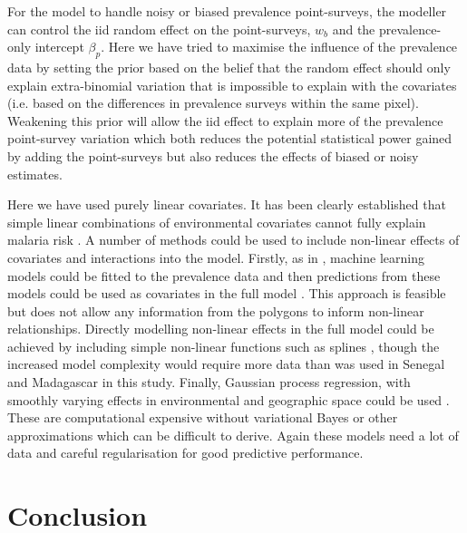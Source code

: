 \documentclass[10pt,letterpaper]{article}
\begin{document}
For the model to handle noisy or biased prevalence point-surveys, the modeller can control the iid random effect on the point-surveys, $w_b$ and the prevalence-only intercept $\beta_p$. 
Here we have tried to maximise the influence of the prevalence data by setting the prior based on the belief that the random effect should only explain extra-binomial variation that is impossible to explain with the covariates (i.e. based on the differences in prevalence surveys within the same pixel).
Weakening this prior will allow the iid effect to explain more of the prevalence point-survey variation which both reduces the potential statistical power gained by adding the point-surveys but also reduces the effects of biased or noisy estimates.


Here we have used purely linear covariates.
It has been clearly established that simple linear combinations of environmental covariates cannot fully explain malaria risk \cite{bhatt2017improved}.
A number of methods could be used to include non-linear effects of covariates and interactions into the model.
Firstly, as in \cite{bhatt2017improved}, machine learning models could be fitted to the prevalence data and then predictions from these models could be used as covariates in the full model \cite{lucas2019model}.
This approach is feasible but does not allow any information from the polygons to inform non-linear relationships.
Directly modelling non-linear effects in the full model could be achieved by including simple non-linear functions such as splines \cite{sissoko2017temporal, sewe2017using, hundessa2018projecting}, though the increased model complexity would require more data than was used in Senegal and Madagascar in this study.
Finally, Gaussian process regression, with smoothly varying effects in environmental and geographic space could be used \cite{law2018variational}.
These are computational expensive without variational Bayes or other approximations \cite{law2018variational, ton2018spatial} which can be difficult to derive.
Again these models need a lot of data and careful regularisation for good predictive performance.





\section*{Conclusion}
\end{document}
